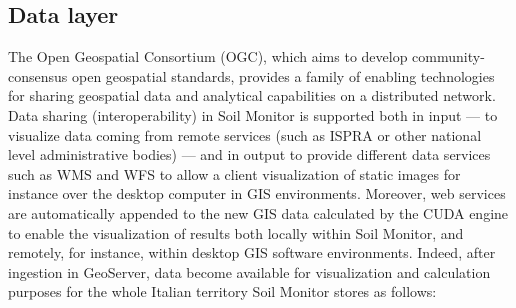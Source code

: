 \documentclass[APA,LATO1COL,doublespace]{WileyNJD-v2}
\begin{document}
\subsection{Data layer}
The Open Geospatial Consortium (OGC), which aims to develop community-consensus open geospatial standards, provides a family of enabling technologies for sharing geospatial data and analytical capabilities on a distributed network. 
Data sharing (interoperability) in Soil Monitor is supported both in input --- to visualize data coming from remote services (such as ISPRA or other national level administrative bodies) --- and in output to provide different data services such as WMS and WFS to allow a client visualization of static images for instance over the desktop computer in GIS environments.
Moreover, web services are automatically appended to the new GIS data calculated by the CUDA engine to enable the visualization of results both locally within Soil Monitor, and remotely, for instance, within desktop GIS software environments.
Indeed, after ingestion in GeoServer, data become available for visualization and calculation purposes for the whole Italian territory Soil Monitor stores as follows:
\end{document}
